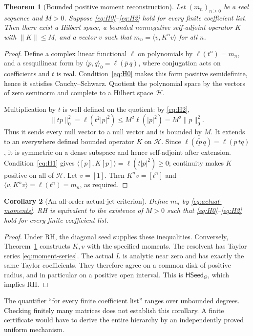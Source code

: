 \documentclass[11pt,a4paper]{article}
\numberwithin{equation}{section}
\newtheorem{theorem}{Theorem}[section]
\newtheorem{corollary}[theorem]{Corollary}
\theoremstyle{definition}
\theoremstyle{remark}
\newcommand{\HH}{\mathcal H}
\newcommand{\ip}[2]{\langle #1,#2\rangle}
\newcommand{\norm}[1]{\lVert #1\rVert}
\newcommand{\HSeed}{\mathsf{HSeed}_{\Theta}}
\begin{document}
\begin{theorem}[Bounded positive moment reconstruction]\label{thm:gns}
Let $(m_n)_{n\geq0}$ be a real sequence and $M>0$.
Suppose \eqref{eq:H0}--\eqref{eq:H2} hold for every finite coefficient
list. Then there exist a Hilbert space, a bounded nonnegative
self-adjoint operator $K$ with $\norm K\leq M$, and a vector $v$
such that $m_n=\ip v{K^nv}$ for all $n$.
\end{theorem}
\begin{proof}
Define a complex linear functional $\ell$ on polynomials by
$\ell(t^n)=m_n$, and a sesquilinear form by
$\ip pq_0=\ell(\overline p\,q)$, where conjugation acts on coefficients
and $t$ is real. Condition~\eqref{eq:H0} makes this form positive
semidefinite, hence it satisfies Cauchy--Schwarz. Quotient the polynomial
space by the vectors of zero seminorm and complete to a Hilbert space
$\HH$.

Multiplication by $t$ is well defined on the quotient: by
\eqref{eq:H2},
\[
\norm{tp}_0^2=\ell(t^2|p|^2)\leq M^2\ell(|p|^2)=M^2\norm p_0^2.
\]
Thus it sends every null vector to a null vector and is bounded by
$M$. It extends to an everywhere defined bounded operator $K$ on
$\HH$. Since
$\ell(\overline{tp}\,q)=\ell(\overline p\,tq)$, it is symmetric
on a dense subspace and hence self-adjoint after extension.
Condition~\eqref{eq:H1} gives
$\ip{[p]}{K[p]}=\ell(t|p|^2)\geq0$; continuity makes $K$ positive
on all of $\HH$. Let $v=[1]$. Then $K^nv=[t^n]$ and
$\ip v{K^nv}=\ell(t^n)=m_n$, as required.
\end{proof}

\begin{corollary}[An all-order actual-jet criterion]\label{cor:moment-criterion}
Define $m_n$ by \eqref{eq:actual-moments}. RH is equivalent to the
existence of $M>0$ such that \eqref{eq:H0}--\eqref{eq:H2} hold
for every finite coefficient list.
\end{corollary}
\begin{proof}
Under RH, the diagonal seed supplies these inequalities.
Conversely, Theorem~\ref{thm:gns} constructs $K,v$ with the specified
moments. The resolvent has Taylor series \eqref{eq:moment-series}.
The actual $L$ is analytic near zero and has exactly the same Taylor
coefficients. They therefore agree on a common disk of positive radius,
and in particular on a positive open interval. This is $\HSeed$,
which implies RH.
\end{proof}

The quantifier ``for every finite coefficient list'' ranges over
unbounded degrees. Checking finitely many matrices does not establish
this corollary. A finite certificate would have to derive the entire
hierarchy by an independently proved uniform mechanism.
\end{document}

